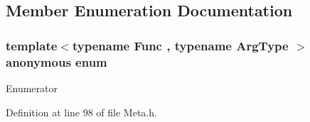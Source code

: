 \subsection{Member Enumeration Documentation}
\hypertarget{structei__result__of_3_01_func_07_arg_type_08_4_acbb3bb6ad0e452c8577ef88c444d5566}{\subsubsection[{anonymous enum}]{\setlength{\rightskip}{0pt plus 5cm}template$<$typename Func , typename Arg\-Type $>$ anonymous enum}}\label{structei__result__of_3_01_func_07_arg_type_08_4_acbb3bb6ad0e452c8577ef88c444d5566}
\begin{Desc}
\item[Enumerator]\par
\begin{description}
\item[{\em 
\hypertarget{structei__result__of_3_01_func_07_arg_type_08_4_acbb3bb6ad0e452c8577ef88c444d5566a6085dc539a5ca6f310f1d481b7c0dd1a}{Functor\-Type}\label{structei__result__of_3_01_func_07_arg_type_08_4_acbb3bb6ad0e452c8577ef88c444d5566a6085dc539a5ca6f310f1d481b7c0dd1a}
}]\end{description}
\end{Desc}


Definition at line 98 of file Meta.\-h.



